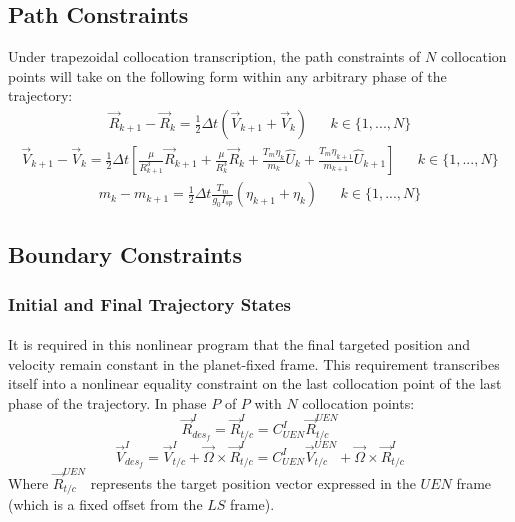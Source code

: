 \subsection{Path Constraints}
Under trapezoidal collocation transcription, the path constraints of $N$ collocation points will take on the following form within any arbitrary phase of the trajectory:
\begin{align}
\vec{R}_{k+1} - \vec{R}_k = 
\frac{1}{2}\Delta t ( \vec{V}_{k+1} + \vec{V}_k ) &&
k \in \{ 1, ... , N \}
\end{align}
\begin{align}
\vec{V}_{k+1} - \vec{V}_k = 
\frac{1}{2}\Delta t \left[ \frac{\mu }{R_{k+1}^3}\vec{R}_{k+1} + \frac{\mu }{R_{k}^3}\vec{R}_{k} +  \frac{T_m \eta_k}{m_k} \hat{U}_{k} + \frac{T_m \eta_{k+1}}{m_{k+1}} \hat{U}_{k+1} \right] &&
k \in \{ 1, ... , N \}
\end{align}
\begin{align}
m_{k} - m_{k+1} = 
\frac{1}{2}\Delta t \frac{T_m}{g_0 I_{sp}} ( \eta_{k+1} + \eta_{k} ) &&
k \in \{ 1, ... , N \}
\end{align}
\subsection{Boundary Constraints}
\subsubsection{Initial and Final Trajectory States}
\paragraph{}
It is required in this nonlinear program that the final targeted position and velocity remain constant in the planet-fixed frame. This requirement transcribes itself into a nonlinear equality constraint on the last collocation point of the last phase of the trajectory. In phase $P$ of $P$ with $N$ collocation points:
\begin{equation}
\vec{R}_{des_{f}}^{I} = \vec{R}_{t/c}^{I} = C_{\mathit{UEN}}^{I} \vec{R}_{t/c}^{\mathit{UEN}}
\end{equation}
\begin{equation}
\vec{V}_{des_{f}}^{I} = \vec{V}_{t/c}^{I} + \vec{\Omega} \times \vec{R}_{t/c}^{I} = C_{\mathit{UEN}}^{I} \vec{V}_{t/c}^{\mathit{UEN}} + \vec{\Omega} \times \vec{R}_{t/c}^{I}
\end{equation}
Where  $\vec{R}_{t/c}^{\mathit{UEN}}$ represents the target position vector expressed in the $\mathit{UEN}$ frame (which is a fixed offset from the $\mathit{LS}$ frame).
